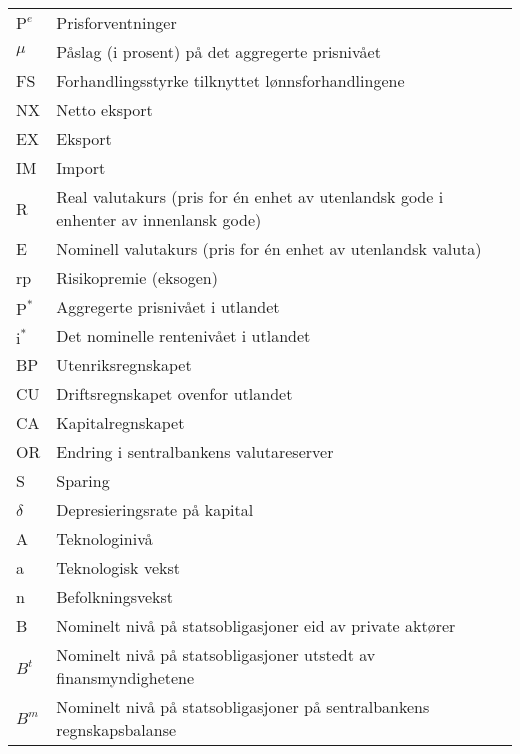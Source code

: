 \documentclass[11pt]{article}
\begin{document}
\begin{center}
\begin{tabular}{ll}
\(\text{P}^{e}\) & Prisforventninger\\
\(\mu\) & Påslag (i prosent) på det aggregerte prisnivået\\
FS & Forhandlingsstyrke tilknyttet lønnsforhandlingene\\
NX & Netto eksport\\
EX & Eksport\\
IM & Import\\
R & Real valutakurs (pris for én enhet av utenlandsk gode i enhenter av innenlansk gode)\\
E & Nominell valutakurs (pris for én enhet av utenlandsk valuta)\\
rp & Risikopremie (eksogen)\\
\(\text{P}^{*}\) & Aggregerte prisnivået i utlandet\\
\(\text{i}^{*}\) & Det nominelle rentenivået i utlandet\\
BP & Utenriksregnskapet\\
CU & Driftsregnskapet ovenfor utlandet\\
CA & Kapitalregnskapet\\
OR & Endring i sentralbankens valutareserver\\
S & Sparing\\
\(\delta\) & Depresieringsrate på kapital\\
A & Teknologinivå\\
a & Teknologisk vekst\\
n & Befolkningsvekst\\
B & Nominelt nivå på statsobligasjoner eid av private aktører\\
\(B^{t}\) & Nominelt nivå på statsobligasjoner utstedt av finansmyndighetene\\
\(B^{m}\) & Nominelt nivå på statsobligasjoner på sentralbankens regnskapsbalanse\\
\hline
\end{tabular}
\end{center}
\end{document}
